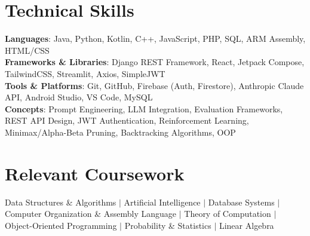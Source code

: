 \documentclass[letterpaper,11pt]{article}
\begin{document}
\section{Technical Skills}
\begin{itemize}[leftmargin=0.15in, label={}]
  \small{\item{
    \textbf{Languages}{: Java, Python, Kotlin, C++, JavaScript, PHP, SQL, ARM Assembly, HTML/CSS} \\
    \textbf{Frameworks \& Libraries}{: Django REST Framework, React, Jetpack Compose, TailwindCSS, Streamlit, Axios, SimpleJWT} \\
    \textbf{Tools \& Platforms}{: Git, GitHub, Firebase (Auth, Firestore), Anthropic Claude API, Android Studio, VS Code, MySQL} \\
    \textbf{Concepts}{: Prompt Engineering, LLM Integration, Evaluation Frameworks, REST API Design, JWT Authentication, Reinforcement Learning, Minimax/Alpha-Beta Pruning, Backtracking Algorithms, OOP} \\
  }}
\end{itemize}

\section{Relevant Coursework}
Data Structures \& Algorithms $|$ Artificial Intelligence $|$ Database Systems $|$ Computer Organization \& Assembly Language $|$ Theory of Computation $|$ Object-Oriented Programming $|$ Probability \& Statistics $|$ Linear Algebra
\end{document}
